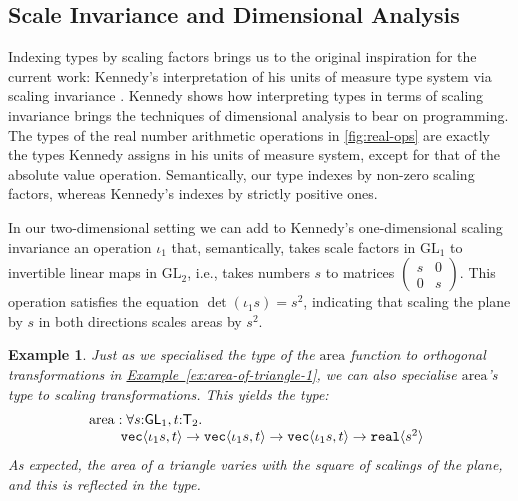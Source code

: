 \documentclass{sigplanconf}
\newcommand{\GL}[1]{\mathrm{GL}_#1}
\newcommand{\SynGL}[1]{\mathsf{GL}_#1}
\newcommand{\SynTransl}[1]{\mathsf{T}_#1}
\newcommand{\tyPrim}[2]{\textup{\texttt{#1}}\langle #2 \rangle}
\newcommand{\exref}[1]{\hyperref[#1]{Example~\ref*{#1}}}
\theoremstyle{examplestyle}
\newtheorem{example}{Example}
\theoremstyle{restatementstyle}
\begin{document}

\subsection{Scale Invariance and Dimensional Analysis}
\label{sec:scale-invariance}

Indexing types by scaling factors brings us to the original
inspiration for the current work: Kennedy's interpretation of his
units of measure type system via scaling invariance
\cite{kennedy97relational}. Kennedy shows how interpreting types in
terms of scaling invariance brings the techniques of dimensional
analysis to bear on programming. The types of the real number
arithmetic operations in \autoref{fig:real-ops} are exactly the types
Kennedy assigns in his units of measure system, except for that of the
absolute value operation. Semantically, our type indexes by
non-zero scaling factors, whereas Kennedy's indexes by strictly
positive ones. 

In our two-dimensional setting we can add to Kennedy's one-dimensional
scaling invariance an operation $\iota_1$ that, semantically, takes
scale factors in $\GL{1}$ to invertible linear maps in $\GL{2}$,
i.e., takes numbers $s$ to matrices $\left(
  \begin{smallmatrix}s & 0 \\ 0 & s\end{smallmatrix}\right)$.  This
operation satisfies the equation $\det (\iota_1 s) = s^2$, indicating
that scaling the plane by $s$ in both directions scales areas by
$s^2$. %

\begin{example}\label{ex:area-of-triangle-2}
  Just as we specialised the type of the $\mathrm{area}$ function to
  orthogonal transformations in \exref{ex:area-of-triangle-1}, we can
  also specialise $\mathrm{area}$'s type to scaling
  transformations. This yields the type:
  \begin{displaymath}
    \begin{array}{@{}l}
      \mathrm{area} : \forall s\mathord:\SynGL{1}, t\mathord:\SynTransl{2}.\ \\
      \hspace{0.8cm} \tyPrim{vec}{\iota_1s, t} \to \tyPrim{vec}{\iota_1s, t} \to \tyPrim{vec}{\iota_1s, t} \to \tyPrim{real}{s^2}
    \end{array}
  \end{displaymath}
  As expected, the area of a triangle varies with the square of
  scalings of the plane, and this is reflected in the type.
\end{example}
\end{document}
